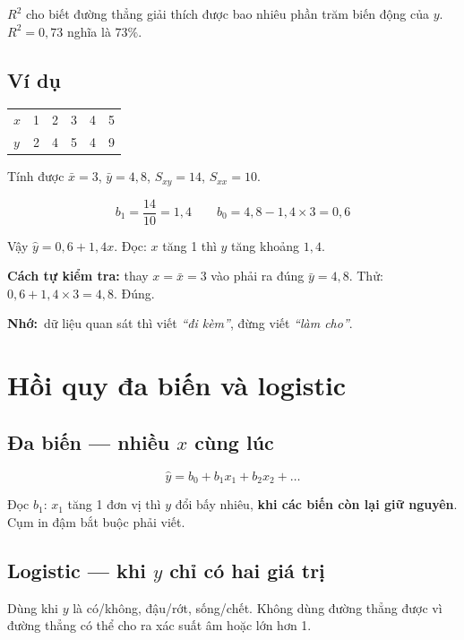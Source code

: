 \documentclass[12pt]{article}
\newcommand{\nho}{\textbf{Nhớ:}\ }
\begin{document}
$R^2$ cho biết đường thẳng giải thích được bao nhiêu phần trăm biến động của $y$.
$R^2 = 0{,}73$ nghĩa là $73\%$.

\subsection*{Ví dụ}

\begin{center}
\begin{tabular}{@{}lccccc@{}}
\toprule
$x$ & 1 & 2 & 3 & 4 & 5 \\
$y$ & 2 & 4 & 5 & 4 & 9 \\
\bottomrule
\end{tabular}
\end{center}

Tính được $\bar x = 3$, $\bar y = 4{,}8$, $S_{xy} = 14$, $S_{xx} = 10$.

\[
b_1 = \frac{14}{10} = 1{,}4
\qquad
b_0 = 4{,}8 - 1{,}4 \times 3 = 0{,}6
\]

Vậy $\hat y = 0{,}6 + 1{,}4x$. Đọc: $x$ tăng 1 thì $y$ tăng khoảng $1{,}4$.

\textbf{Cách tự kiểm tra:} thay $x = \bar x = 3$ vào phải ra đúng $\bar y = 4{,}8$.
Thử: $0{,}6 + 1{,}4 \times 3 = 4{,}8$. Đúng.

\nho dữ liệu quan sát thì viết \emph{``đi kèm''}, đừng viết \emph{``làm cho''}.

\section{Hồi quy đa biến và logistic}

\subsection*{Đa biến --- nhiều $x$ cùng lúc}

\[
\hat y = b_0 + b_1 x_1 + b_2 x_2 + \dots
\]

Đọc $b_1$: $x_1$ tăng 1 đơn vị thì $y$ đổi bấy nhiêu, \textbf{khi các biến còn lại
giữ nguyên}. Cụm in đậm bắt buộc phải viết.

\subsection*{Logistic --- khi $y$ chỉ có hai giá trị}

Dùng khi $y$ là có/không, đậu/rớt, sống/chết. Không dùng đường thẳng được vì đường
thẳng có thể cho ra xác suất âm hoặc lớn hơn 1.
\end{document}
